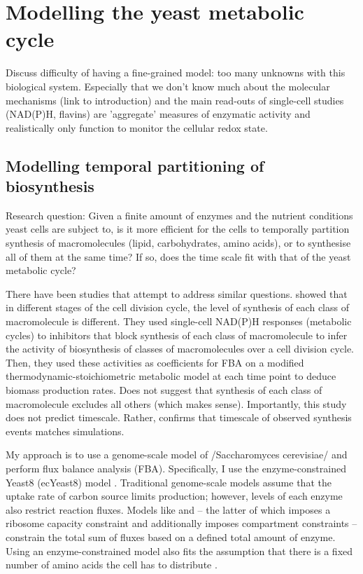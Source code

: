 \chapter{Modelling the yeast metabolic cycle}
\label{ch:model}

Discuss difficulty of having a fine-grained model: too many unknowns with this biological system.
Especially that we don't know much about the molecular mechanisms (link to introduction) and the main read-outs of single-cell studies (NAD(P)H, flavins) are 'aggregate' measures of enzymatic activity and realistically only function to monitor the cellular redox state.

\section{Modelling temporal partitioning of biosynthesis}
\label{sec:model-temporal}
Research question: Given a finite amount of enzymes and the nutrient conditions yeast cells are subject to, is it more efficient for the cells to temporally partition synthesis of macromolecules (lipid, carbohydrates, amino acids), or to synthesise all of them at the same time?
If so, does the time scale fit with that of the yeast metabolic cycle?

There have been studies that attempt to address similar questions.
\textcite{takhaveevTemporalSegregationBiosynthetic2023} showed that in different stages of the cell division cycle, the level of synthesis of each class of macromolecule is different.
They used single-cell NAD(P)H responses (metabolic cycles) to inhibitors that block synthesis of each class of macromolecule to infer the activity of biosynthesis of classes of macromolecules over a cell division cycle.
Then, they used these activities as coefficients for FBA on a modified thermodynamic-stoichiometric metabolic model at each time point to deduce biomass production rates.
Does not suggest that synthesis of each class of macromolecule excludes all others (which makes sense).
Importantly, this study does not predict timescale.
Rather, confirms that timescale of observed synthesis events matches simulations.

My approach is to use a genome-scale model of /Saccharomyces cerevisiae/ and perform flux balance analysis (FBA).
Specifically, I use the enzyme-constrained Yeast8 (ecYeast8) model \parencite{luConsensusCerevisiaeMetabolic2019}.
Traditional genome-scale models assume that the uptake rate of carbon source limits production; however, levels of each enzyme also restrict reaction fluxes.
Models like \textcite{sanchezImprovingPhenotypePredictions2017} and \textcite{elsemmanWholecellModelingYeast2022} -- the latter of which imposes a ribosome capacity constraint and additionally imposes compartment constraints -- constrain the total sum of fluxes based on a defined total amount of enzyme.
Using an enzyme-constrained model also fits the assumption that there is a fixed number of amino acids the cell has to distribute \parencite{weisseMechanisticLinksCellular2015}.

